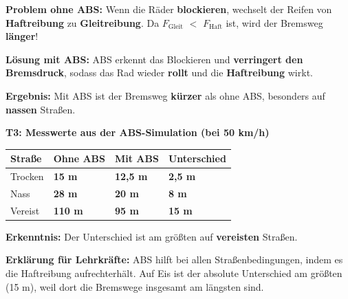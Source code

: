 \documentclass[11pt,a4paper]{article}
\newcommand{\aufgabe}[1]{\noindent\textbf{\textcolor{fachfarbe}{#1}}}
\newcommand{\lsg}[1]{\textcolor{loesung}{\textbf{#1}}}
\newcommand{\stern}[1]{\textcolor{merkerand}{\textbf{#1}}}
\begin{document}
\vspace{0.3em}

\begin{merkebox}[title=B7: ABS -- Das Antiblockiersystem \stern{$\star\star\star$}]
\small
\textbf{Problem ohne ABS:} Wenn die Räder \lsg{blockieren}, wechselt der Reifen von \lsg{Haftreibung} zu \lsg{Gleitreibung}. Da $F_{\text{Gleit}}$ \lsg{$<$} $F_{\text{Haft}}$ ist, wird der Bremsweg \lsg{länger}!

\vspace{0.3em}
\textbf{Lösung mit ABS:} ABS erkennt das Blockieren und \lsg{verringert den Bremsdruck}, sodass das Rad wieder \lsg{rollt} und die \lsg{Haftreibung} wirkt.

\vspace{0.3em}
\textbf{Ergebnis:} Mit ABS ist der Bremsweg \lsg{kürzer} als ohne ABS, besonders auf \lsg{nassen} Straßen.
\end{merkebox}

\vspace{0.3em}

\aufgabe{T3: Messwerte aus der ABS-Simulation (bei 50 km/h)}

\vspace{0.2em}
{\small
\renewcommand{\arraystretch}{1.3}
\begin{tabular}{|p{3cm}|p{3.5cm}|p{3.5cm}|p{3.5cm}|}
\hline
\textbf{Straße} & \textbf{Ohne ABS} & \textbf{Mit ABS} & \textbf{Unterschied} \\
\hline
Trocken & \lsg{15 m} & \lsg{12,5 m} & \lsg{2,5 m} \\
\hline
Nass & \lsg{28 m} & \lsg{20 m} & \lsg{8 m} \\
\hline
Vereist & \lsg{110 m} & \lsg{95 m} & \lsg{15 m} \\
\hline
\end{tabular}
}

\vspace{0.2em}
\textbf{Erkenntnis:} Der Unterschied ist am größten auf \lsg{vereisten} Straßen.

\vspace{0.3em}
{\small\textcolor{fachfarbe}{\textbf{Erklärung für Lehrkräfte:}} ABS hilft bei allen Straßenbedingungen, indem es die Haftreibung aufrechterhält. Auf Eis ist der absolute Unterschied am größten (15 m), weil dort die Bremswege insgesamt am längsten sind.}
\end{document}
